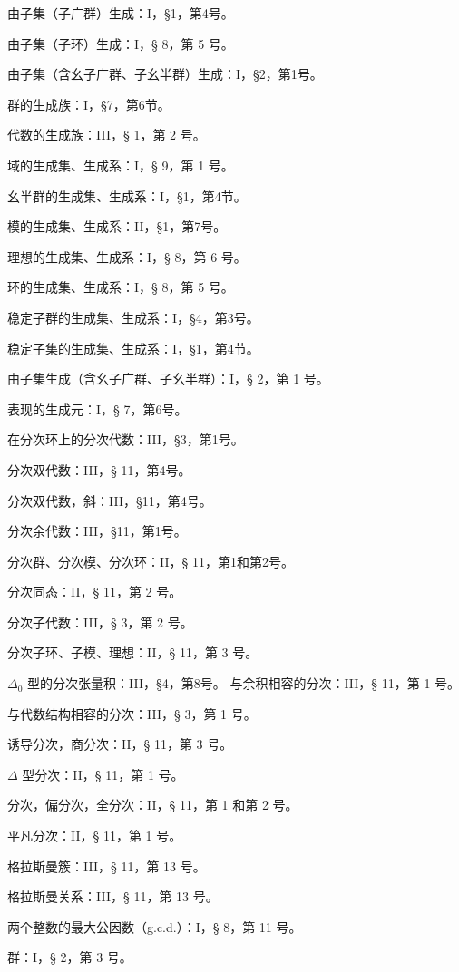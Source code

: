 由子集（子广群）生成：I，§1，第4号。

由子集（子环）生成：I，§ 8，第 5 号。

由子集（含幺子广群、子幺半群）生成：I，§2，第1号。

群的生成族：I，§7，第6节。

代数的生成族：III，§ 1，第 2 号。

域的生成集、生成系：I，§ 9，第 1 号。

幺半群的生成集、生成系：I，§1，第4节。

模的生成集、生成系：II，§1，第7号。

理想的生成集、生成系：I，§ 8，第 6 号。

环的生成集、生成系：I，§ 8，第 5 号。

稳定子群的生成集、生成系：I，§4，第3号。

稳定子集的生成集、生成系：I，§1，第4节。

由子集生成（含幺子广群、子幺半群）：I，§ 2，第 1 号。

表现的生成元：I，§ 7，第6号。

在分次环上的分次代数：III，§3，第1号。

分次双代数：III，§ 11，第4号。

分次双代数，斜：III，§11，第4号。

分次余代数：III，§11，第1号。

分次群、分次模、分次环：II，§ 11，第1和第2号。

分次同态：II，§ 11，第 2 号。

分次子代数：III，§ 3，第 2 号。

分次子环、子模、理想：II，§ 11，第 3 号。

 \(\Delta_0\) 型的分次张量积：III，§4，第8号。
\relax{}
与余积相容的分次：III，§ 11，第 1 号。

与代数结构相容的分次：III，§ 3，第 1 号。

诱导分次，商分次：II，§ 11，第 3 号。

\(\Delta\) 型分次：II，§ 11，第 1 号。

分次，偏分次，全分次：II，§ 11，第 1 和第 2 号。

平凡分次：II，§ 11，第 1 号。

格拉斯曼簇：III，§ 11，第 13 号。

格拉斯曼关系：III，§ 11，第 13 号。

两个整数的最大公因数（g.c.d.）：I，§ 8，第 11 号。

群：I，§ 2，第 3 号。


